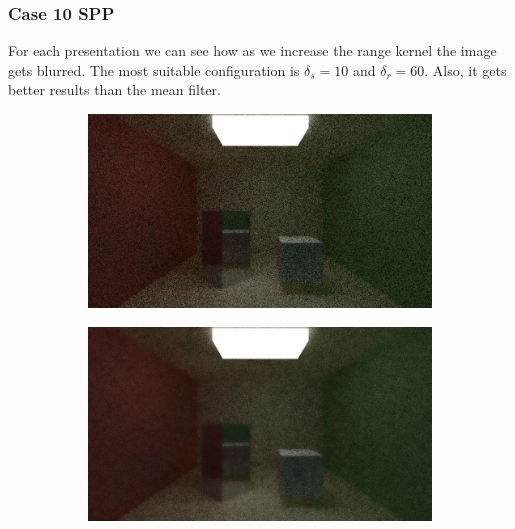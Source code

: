 \documentclass[titlepage,12pt]{report}
\begin{document}
\subsubsection{Case 10 SPP}

For each presentation we can see how as we increase the range kernel the image gets blurred. The most suitable configuration is $\delta_s = 10$ and $\delta_r = 60$. Also, it gets better results than the mean filter.

\begin{figure}[H]
	\centering
	\begin{subfigure}{.48\textwidth}
		\centering
		\includegraphics[scale=0.2]{media/bilateral/cornell_normal_10_bilateral_filter_21_5_10.png}
		\label{bilateral_filter_1}
	\end{subfigure}
	\begin{subfigure}{.48\textwidth}
		\centering
		\includegraphics[scale=0.2]{media/bilateral/cornell_normal_10_bilateral_filter_21_5_20.png}
		\label{bilateral_filter_2}
	\end{subfigure}


\end{figure}
\end{document}
